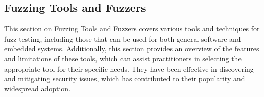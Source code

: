 \subsection{Fuzzing Tools and Fuzzers}

This section on Fuzzing Tools and Fuzzers covers various tools and techniques
for fuzz testing, including those that can be used for both general
software and embedded systems. Additionally, this section provides an
overview of the features and limitations of these tools,
which can assist practitioners in selecting the appropriate tool
for their specific needs. They have been effective in discovering and
mitigating security issues, which has contributed to their popularity
and widespread adoption.




